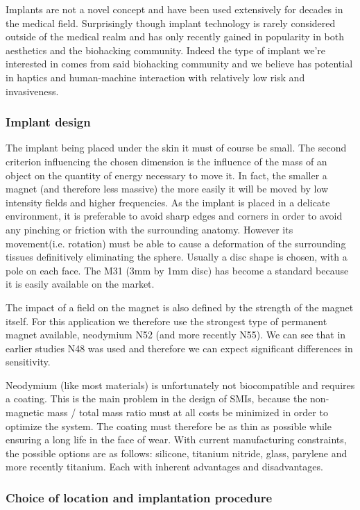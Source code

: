 \documentclass[10pt,journal,compsoc]{IEEEtran}
\begin{document}
Implants are not a novel concept and have been used extensively for decades in the medical field. Surprisingly though implant technology is rarely considered outside of the medical realm and has only recently gained in popularity in both aesthetics and the biohacking community.
Indeed the type of implant we're interested in comes from said biohacking community and we believe has potential in haptics and human-machine interaction with relatively low risk and invasiveness.

\subsubsection{Implant design} 

The implant being placed under the skin it must of course be small. The second criterion influencing the chosen dimension is the influence of the mass of an object on the quantity of energy necessary to move it. In fact, the smaller a magnet (and therefore less massive) the more easily it will be moved by low intensity fields and higher frequencies. As the implant is placed in a delicate environment, it is preferable to avoid sharp edges and corners in order to avoid any pinching or friction with the surrounding anatomy. However its movement(i.e. rotation) must be able to cause a deformation of the surrounding tissues definitively eliminating the sphere. Usually a disc shape is chosen, with a pole on each face.
The M31 (3mm by 1mm disc) has become a standard because it is easily available on the market.

The impact of a field on the magnet is also defined by the strength of the magnet itself. For this application we therefore use the strongest type of permanent magnet available, neodymium N52 (and more recently N55). We can see that in earlier studies \cite{hameed2010ieee} N48 was used and therefore we can expect significant differences in sensitivity.

Neodymium (like most materials) is unfortunately not biocompatible and requires a coating. This is the main problem in the design of SMIs, because the non-magnetic mass / total mass ratio must at all costs be minimized in order to optimize the system. The coating must therefore be as thin as possible while ensuring a long life in the face of wear. With current manufacturing constraints, the possible options are as follows: silicone, titanium nitride, glass, parylene and more recently titanium. Each with inherent advantages and disadvantages.
			
\subsubsection{Choice of location and implantation procedure}
\label{Choice of location and implantation procedure}
\end{document}
